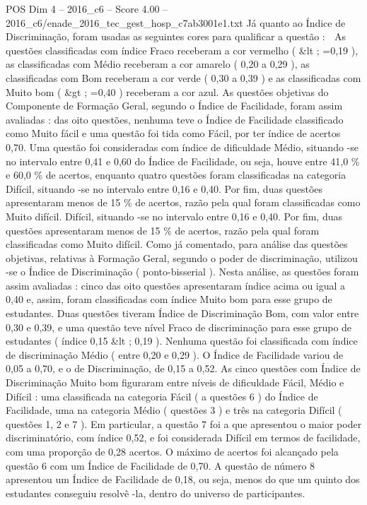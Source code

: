\begin{textsample}{POS Dim 4 – 2016\_c6 – Score 4.00 – 2016\_c6/enade\_2016\_tec\_gest\_hosp\_c7ab3001e1.txt}
Já quanto ao Índice de Discriminação, foram usadas as seguintes cores para qualificar a questão :  As questões classificadas com índice Fraco receberam a cor vermelho ( \&lt ; =0,19 ), as classificadas com Médio receberam a cor amarelo ( 0,20 a 0,29 ), as classificadas com Bom receberam a cor verde ( 0,30 a 0,39 ) e as classificadas com Muito bom ( \&gt ; =0,40 ) receberam a cor azul.
As questões objetivas do Componente de Formação Geral, segundo o Índice de Facilidade, foram assim avaliadas : das oito questões, nenhuma teve o Índice de Facilidade classificado como Muito fácil e uma questão foi tida como Fácil, por ter índice de acertos 0,70.
Uma questão foi consideradas com índice de dificuldade Médio, situando -se no intervalo entre 0,41 e 0,60 do Índice de Facilidade, ou seja, houve entre 41,0 \% e 60,0 \% de acertos, enquanto quatro questões foram classificadas na categoria Difícil, situando -se no intervalo entre 0,16 e 0,40.
Por fim, duas questões apresentaram menos de 15 \% de acertos, razão pela qual foram classificadas como Muito difícil.
Difícil, situando -se no intervalo entre 0,16 e 0,40.
Por fim, duas questões apresentaram menos de 15 \% de acertos, razão pela qual foram classificadas como Muito difícil.
Como já comentado, para análise das questões objetivas, relativas à Formação Geral, segundo o poder de discriminação, utilizou -se o Índice de Discriminação ( ponto-bisserial ).
Nesta análise, as questões foram assim avaliadas : cinco das oito questões apresentaram índice acima ou igual a 0,40 e, assim, foram classificadas com índice Muito bom para esse grupo de estudantes.
Duas questões tiveram Índice de Discriminação Bom, com valor entre 0,30 e 0,39, e uma questão teve nível Fraco de discriminação para esse grupo de estudantes ( índice 0,15 \&lt ; 0,19 ).
Nenhuma questão foi classificada com índice de discriminação Médio ( entre 0,20 e 0,29 ).
O Índice de Facilidade variou de 0,05 a 0,70, e o de Discriminação, de 0,15 a 0,52.
As cinco questões com Índice de Discriminação Muito bom figuraram entre níveis de dificuldade Fácil, Médio e Difícil : uma classificada na categoria Fácil ( a questões 6 ) do Índice de Facilidade, uma na categoria Médio ( questões 3 ) e três na categoria Difícil ( questões 1, 2 e 7 ).
Em particular, a questão 7 foi a que apresentou o maior poder discriminatório, com índice 0,52, e foi considerada Difícil em termos de facilidade, com uma proporção de 0,28 acertos.
O máximo de acertos foi alcançado pela questão 6 com um Índice de Facilidade de 0,70.
A questão de número 8 apresentou um Índice de Facilidade de 0,18, ou seja, menos do que um quinto dos estudantes conseguiu resolvê -la, dentro do universo de participantes.

\end{textsample}
